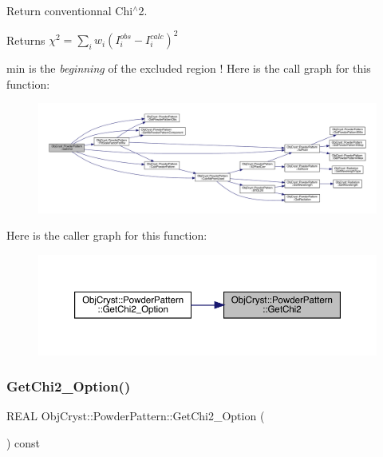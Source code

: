 Return conventionnal Chi$^\wedge$2. 

\begin{DoxyReturn}{Returns}
$ \chi^2 = \sum_i w_i \left(I_i^{obs}-I_i^{calc} \right)^2 $ 
\end{DoxyReturn}
min is the {\itshape beginning} of the excluded region ! Here is the call graph for this function\+:
\nopagebreak
\begin{figure}[H]
\begin{center}
\leavevmode
\includegraphics[width=350pt]{class_obj_cryst_1_1_powder_pattern_ab9fae16effd2ca4b59bf40e0706b86f2_cgraph}
\end{center}
\end{figure}
Here is the caller graph for this function\+:
\nopagebreak
\begin{figure}[H]
\begin{center}
\leavevmode
\includegraphics[width=350pt]{class_obj_cryst_1_1_powder_pattern_ab9fae16effd2ca4b59bf40e0706b86f2_icgraph}
\end{center}
\end{figure}
\mbox{\label{class_obj_cryst_1_1_powder_pattern_ae76721ca73e29a776de4b20fc23514a6}} 
\subsubsection{\texorpdfstring{GetChi2\_Option()}{GetChi2\_Option()}}
{\footnotesize\ttfamily R\+E\+AL Obj\+Cryst\+::\+Powder\+Pattern\+::\+Get\+Chi2\+\_\+\+Option (\begin{DoxyParamCaption}{ }\end{DoxyParamCaption}) const}


